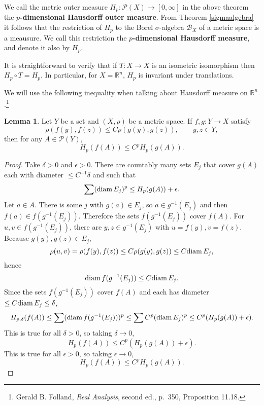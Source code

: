 \documentclass{article}
\newcommand{\diam}{\ensuremath\mathrm{diam}\,}
\theoremstyle{definition}
\newtheorem{lemma}[theorem]{Lemma}
\theoremstyle{definition}
\begin{document}
We call the metric outer measure $H_p:\mathscr{P}(X) \to [0,\infty]$ in the above theorem the \textbf{$p$-dimensional Hausdorff outer measure}.
From Theorem \ref{sigmaalgebra} it follows that the restriction of $H_p$ to the Borel $\sigma$-algebra $\mathscr{B}_X$ of a metric space is a meausure. We call
this restriction the \textbf{$p$-dimensional Hausdorff measure}, and denote it also by $H_p$. 

It is straightforward to verify that 
if $T:X \to X$ is an isometric isomorphism then $H_p \circ T=H_p$. 
In particular, for $X=\mathbb{R}^n$, $H_p$ is invariant under translations. 

We will use the following inequality when talking about Hausdorff measure on $\mathbb{R}^n$.\footnote{Gerald B. Folland, {\em Real Analysis}, second ed., p.~350,
Proposition 11.18.}

\begin{lemma}
Let $Y$ be a set and $(X,\rho)$ be a metric space. If $f,g:Y \to X$ satisfy
\[
\rho(f(y),f(z)) \leq C \rho(g(y),g(z)), \qquad y,z \in Y,
\]
then for any $A \in \mathscr{P}(Y)$,
\[
H_p(f(A)) \leq C^p H_p(g(A)).
\]
\label{dilation}
\end{lemma}
\begin{proof}
Take $\delta>0$ and $\epsilon>0$. There are countably many sets $E_j$ that cover $g(A)$ each with diameter $\leq C^{-1}\delta$ and such that
\[
\sum (\diam E_j)^p \leq H_p(g(A))+\epsilon.
\]
Let $a \in A$. There is some $j$ with $g(a) \in E_j$, so $a \in g^{-1}(E_j)$ and then $f(a) \in f(g^{-1}(E_j))$. Therefore
the sets $f(g^{-1}(E_j))$ cover $f(A)$. For $u,v \in f(g^{-1}(E_j))$, there are $y,z \in g^{-1}(E_j)$ with
$u=f(y), v=f(z)$. Because $g(y),g(z) \in E_j$,
\[
\rho(u,v) = \rho(f(y),f(z)) \leq C \rho(g(y),g(z)) \leq C \diam E_j,
\]
hence
\[
\diam f(g^{-1}(E_j)) \leq C \diam E_j.
\]
Since the sets $f(g^{-1}(E_j))$ cover $f(A)$ and each has diameter $\leq C \diam E_j \leq \delta$, 
\[
H_{p,\delta}(f(A)) \leq \sum (\diam f(g^{-1}(E_j)))^p
\leq \sum C^p (\diam E_j)^p
\leq C^p (H_p(g(A))+\epsilon).
\]
This is true for all $\delta>0$, so taking $\delta \to 0$,
\[
H_p(f(A)) \leq C^p(H_p(g(A))+\epsilon).
\]
This is true for all $\epsilon>0$, so taking $\epsilon \to 0$,
\[
H_p(f(A)) \leq C^p H_p(g(A)).
\]
\end{proof}
\end{document}
